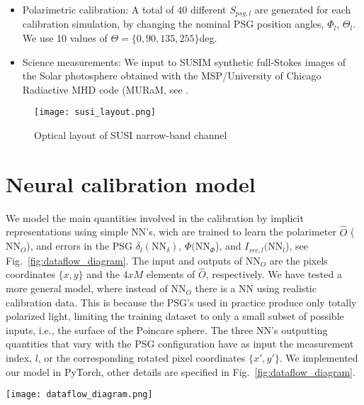 \documentclass[baaa]{baaa}
\begin{document}
\begin{itemize}
    \item Polarimetric calibration: A total of $40$ different $S_{psg,l}$ are generated for each calibration simulation, by changing the nominal PSG position angles, $\Phi_l$, $\Theta_l$. We use 10 values of $\Theta=\{0,90,135,255\}$deg.\\
    \item Science measurements: We input to SUSIM synthetic full-Stokes images of the Solar photosphere obtained with the MSP/University of Chicago Radiactive MHD code (MURaM, see \citep{Przybylski2022}.
\end{itemize}

\begin{figure}[ht]
    \centering
    \texttt{[image: susi\_layout.png]}
    \caption{Optical layout of SUSI narrow-band channel}
    \label{fig:susi_layout}
\end{figure}

\section{Neural calibration model}

We model the main quantities involved in the calibration by implicit representations using simple NN's, wich are trained to learn the polarimeter $\hat{O}$ ($\text{NN}_O$), and errors in the PSG $\delta_l (\text{NN}_\delta)$, $\Phi (\text{NN}_\Phi$), and $I_{src,l} (\text{NN}_l$), see Fig.~\ref{fig:dataflow_diagram}. The input and outputs of $\text{NN}_O$ are the pixels coordinates $\{x,y\}$ and the $4xM$ elements of $\hat{O}$, respectively. We have tested a more general model, where instead of $\text{NN}_O$ there is a NN using realistic calibration data. This is because the PSG's used in practice produce only totally polarized light, limiting the training dataset to only a small subset of possible inputs, i.e., the surface of the Poincare sphere. The three NN's outputting quantities that vary with the PSG configuration have as input the measurement index, $l$, or the corresponding rotated pixel coordinates $\{x',y'\}$. We implemented our model in PyTorch, other details are specified in Fig.~\ref{fig:dataflow_diagram}.

\begin{figure*}[ht]
    \centering
    \texttt{[image: dataflow\_diagram.png]}
    \caption{Block diagram showing the data flow and main components of the proposed neural calibration model. Input data, NNs and computation steps are shown in orange, green, and blue boxes, respectively. The text inside the NN boxes specifies the input, hidden layer, and output dimensions. In this implementation, we use fully-connected, multi-layer perceptrons with ELU activation functions for all NNs. We train the model for $\approx$3k epochs, with each batch consisting of $8\times8\,\text{px}^2$ patches taken randomly from input calibration images. Moreover, we adopt the Adam minimization algorithm and the CosineAnnealingRL scheduler for the learning rate.}
    \label{fig:dataflow_diagram}
\end{figure*}
\end{document}
